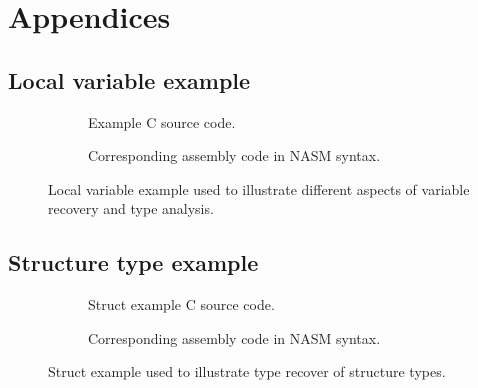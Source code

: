 
\onecolumn

\appendix
\setcounter{secnumdepth}{0}
\section{Appendices}
\setcounter{secnumdepth}{3}
\renewcommand{\thesubsection}{\Alph{subsection}}


\subsection{Local variable example}
\label{app:local_variable_example}

\begin{figure}[htbp]
	\centering
	\begin{subfigure}[ht]{0.3\textwidth}
		\centering
		
		\caption{Example C source code.}
		\label{fig:local_variable_example_c}
	\end{subfigure}
	\qquad
	\begin{subfigure}[ht]{0.65\textwidth}
		\centering
		
		\caption{Corresponding assembly code in NASM syntax.}
		\label{fig:local_variable_example_asm}
	\end{subfigure}
	\caption{Local variable example used to illustrate different aspects of variable recovery and type analysis.}
	\label{fig:local_variable_example}
\end{figure}


\clearpage

\subsection{Structure type example}
\label{app:struct_example}

\begin{figure}[htbp]
	\centering
	\begin{subfigure}[ht]{0.3\textwidth}
		\centering
		
		\caption{Struct example C source code.}
		\label{fig:struct_example_c}
	\end{subfigure}
	\qquad
	\begin{subfigure}[ht]{0.65\textwidth}
		\centering
		
		\caption{Corresponding assembly code in NASM syntax.}
		\label{fig:struct_example_asm}
	\end{subfigure}
	\caption{Struct example used to illustrate type recover of structure types.}
	\label{fig:struct_example}
\end{figure}

